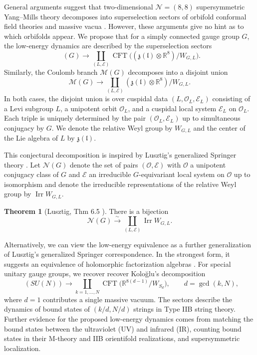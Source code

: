 \documentclass[12pt]{article}
\numberwithin{equation}{section}%
\theoremstyle{definition}
\newtheorem{thm}{Theorem}[section]
\newcommand{\cE}{\mathcal{E}}
\newcommand{\cO}{\mathcal{O}}
\newcommand{\R}{\mathbb{R}}
\newcommand{\fl}{\mathfrak{l}}
\newcommand{\fz}{\mathfrak{z}}
\DeclareMathOperator{\SYM}{SYM^{D=2}_{\mathcal{N} = (8,8)}}
\DeclareMathOperator{\CFT}{CFT}
\DeclareMathOperator{\Irr}{Irr}
\newcommand{\lisom}{\stackrel{\sim}{\longrightarrow}}
\begin{document}
General arguments suggest that two-dimensional $\mathcal{N} = (8,8)$ supersymmetric Yang--Mills theory decomposes into superselection sectors of orbifold conformal field theories and massive vacua \cite{Seiberg:1997ax, Kologlu:2016aev}.  However, these arguments give no hint as to which orbifolds appear.  We propose that
for a simply connected gauge group $G$, the low-energy dynamics are described by the superselection sectors 
\begin{equation*}
\SYM(G) \rightarrow \coprod_{(L, \mathcal{E})} \CFT  \bigl( \left( \fz(\fl) \otimes \R^8 \right)/W_{G,L} \bigr).
\end{equation*}
Similarly, the Coulomb branch $\mathcal{M}(G)$ decomposes into a disjoint union
\begin{equation*}
\mathcal{M}(G) \rightarrow \coprod_{(L, \cE)} \left( \fz(\fl) \otimes \R^8 \right)/W_{G,L}.
\end{equation*}
In both cases, the disjoint union is over cuspidal data $(L, \mathcal{O}_L, \cE_L)$ consisting of a Levi subgroup $L$, a unipotent orbit $\cO_L$, and a cuspidal local system $\cE_L$ on $\cO_L$.
Each triple is uniquely determined by the pair $(\cO_L, \cE_L)$ up to simultaneous conjugacy by $G$. We denote the relative Weyl group by $W_{G,L}$ and the center of the Lie algebra of $L$ by $\fz(\fl)$.

This conjectural decomposition is inspired by Lusztig's generalized Springer theory \cite{MR732546}.  Let
$\mathcal{N}(G)$ denote the set of pairs $(\cO, \cE)$ with $\cO$ a unipotent conjugacy class of $G$ and $\cE$ an irreducible $G$-equivariant local system on $\cO$ up to isomorphism and denote the irreducible representations of the relative Weyl group by $\Irr W_{G,L}$.
\begin{thm}[Lusztig, Thm 6.5 \cite{MR732546}]
There is a bijection
\begin{equation*}
\mathcal{N}(G) \lisom \coprod_{(L, \mathcal{E})} \Irr W_{G,L}.
\end{equation*}
\end{thm}
Alternatively, we can view the low-energy equivalence as a further generalization of Lusztig's generalized Springer correspondence.  In the strongest form, it suggests an equivalence of holomorphic factorization algebras \cite{MR3586504, MR4300181, MR4971881}.  
For special unitary gauge groups, we recover recover
Kolo\u{g}lu's \cite{Kologlu:2016aev} decomposition
\begin{equation*}
\SYM(SU(N)) \rightarrow \coprod_{k=1,\dots, N} \CFT  \bigl( \R^{8(d-1)} /W_{S_d} \bigr), \qquad d = \gcd(k, N),
\end{equation*}
where $d=1$ contributes a single massive vacuum.
The sectors describe the dynamics of bound states of $(k/d, N/d)$ strings in Type IIB string theory.
Further evidence for the proposed low-energy dynamics comes from matching the bound states between the ultraviolet (UV) and infrared (IR), counting bound states in their M-theory and IIB orientifold realizations, and supersymmetric localization.
\end{document}
